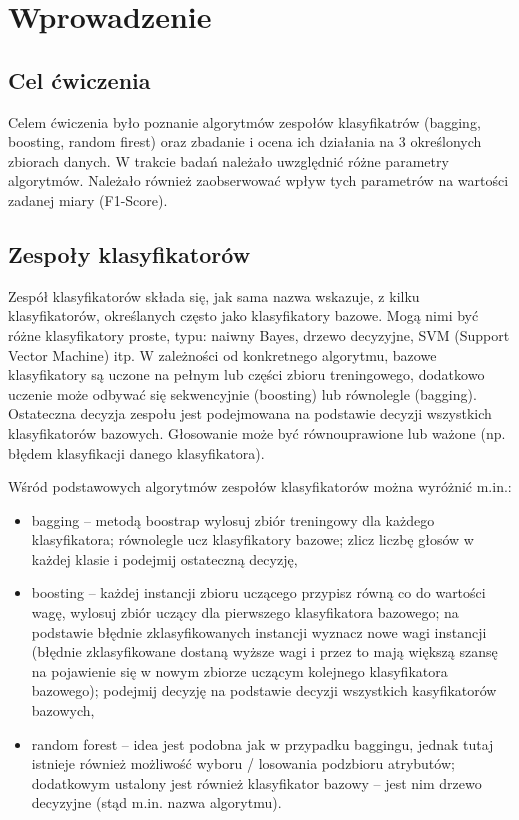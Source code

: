 \section{Wprowadzenie}
    \subsection{Cel ćwiczenia}
        Celem ćwiczenia było poznanie algorytmów zespołów klasyfikatrów (bagging, boosting, random firest)
        oraz zbadanie i ocena ich działania na 3 określonych zbiorach danych. W trakcie badań należało uwzględnić różne
        parametry algorytmów. Należało również zaobserwować wpływ tych parametrów na wartości zadanej miary (F1-Score).

    \subsection{Zespoły klasyfikatorów}
        Zespół klasyfikatorów składa się, jak sama nazwa wskazuje, z kilku klasyfikatorów, określanych
        często jako klasyfikatory bazowe. Mogą nimi być różne klasyfikatory proste, typu: naiwny Bayes,
        drzewo decyzyjne, SVM (Support Vector Machine) itp. W zależności od konkretnego algorytmu,
        bazowe klasyfikatory są uczone na pełnym lub części zbioru treningowego, dodatkowo uczenie może
        odbywać się sekwencyjnie (boosting) lub równolegle (bagging). Ostateczna decyzja zespołu jest podejmowana
        na podstawie decyzji wszystkich klasyfikatorów bazowych. Głosowanie może być równouprawione lub ważone
        (np. błędem klasyfikacji danego klasyfikatora).

        Wśród podstawowych algorytmów zespołów klasyfikatorów można wyróżnić m.in.:

        \begin{itemize}
            \item{bagging -- metodą boostrap wylosuj zbiór treningowy dla każdego klasyfikatora;
                             równolegle ucz klasyfikatory bazowe; zlicz liczbę głosów w każdej klasie
                             i podejmij ostateczną decyzję,}
            \item{boosting -- każdej instancji zbioru uczącego przypisz równą co do wartości wagę,
                              wylosuj zbiór uczący dla pierwszego klasyfikatora bazowego; na podstawie błędnie
                              zklasyfikowanych instancji wyznacz nowe wagi instancji (błędnie zklasyfikowane dostaną
                              wyższe wagi i przez to mają większą szansę na pojawienie się w nowym zbiorze uczącym
                              kolejnego klasyfikatora bazowego); podejmij decyzję na podstawie decyzji wszystkich
                              kasyfikatorów bazowych,}
            \item{random forest -- idea jest podobna jak w przypadku baggingu, jednak tutaj istnieje również możliwość
                              wyboru / losowania podzbioru atrybutów; dodatkowym ustalony jest również klasyfikator
                              bazowy -- jest nim drzewo decyzyjne (stąd m.in. nazwa algorytmu).}
        \end{itemize}

